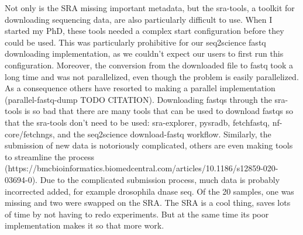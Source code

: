 Not only is the SRA missing important metadata, but the sra-tools, a toolkit for downloading sequencing data, are also particularly difficult to use. When I started my PhD, these tools needed a complex start configuration before they could be used. This was particularly prohibitive for our seq2science fastq downloading implementation, as we couldn't expect our users to first run this configuration. Moreover, the conversion from the downloaded file to fastq took a long time and was not parallelized, even though the problem is easily parallelized. As a consequence others have resorted to making a parallel implementation (parallel-fastq-dump TODO CITATION). Downloading fastqs through the sra-tools is so bad that there are many tools that can be used to download fastqs so that the sra-tools don't need to be used: sra-explorer, pysradb\cite{pysradb}, fetchfastq, nf-core/fetchngs, and the seq2science download-fastq workflow. Similarly, the submission of new data is notoriously complicated, others are even making tools to streamline the process (https://bmcbioinformatics.biomedcentral.com/articles/10.1186/s12859-020-03694-0). Due to the complicated submission process, much data is probably incorrected added, for example drosophila dnase seq. Of the 20 samples, one was missing and two were swapped on the SRA. The SRA is a cool thing, saves lots of time by not having to redo experiments. But at the same time its poor implementation makes it so that more work.




